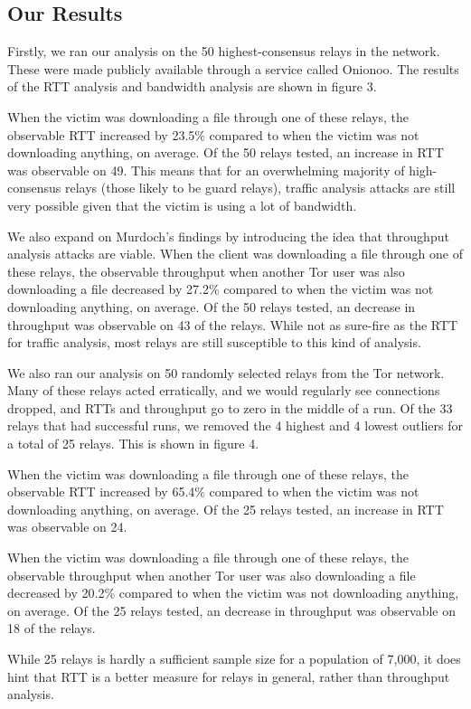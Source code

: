 \documentclass[12pt,journal]{IEEEtran}
\begin{document}
\subsection{Our Results}
Firstly, we ran our analysis on the 50 highest-consensus relays in the network. These were made publicly available through a service called Onionoo. The results of the RTT analysis and bandwidth analysis are shown in figure 3.
\par
When the victim was downloading a file through one of these relays, the observable RTT increased by 23.5\% compared to when the victim was not downloading anything, on average. Of the 50 relays tested, an increase in RTT was observable on 49. This means that for an overwhelming majority of high-consensus relays (those likely to be guard relays), traffic analysis attacks are still very possible given that the victim is using a lot of bandwidth.
\par
We also expand on Murdoch's findings by introducing the idea that throughput analysis attacks are viable. When the client was downloading a file through one of these relays, the observable throughput when another Tor user was also downloading a file decreased by 27.2\% compared to when the victim was not downloading anything, on average. Of the 50 relays tested, an decrease in throughput was observable on 43 of the relays. While not as sure-fire as the RTT for traffic analysis, most relays are still susceptible to this kind of analysis.

\par
We also ran our analysis on 50 randomly selected relays from the Tor network. Many of these relays acted erratically, and we would regularly see connections dropped, and RTTs and throughput go to zero in the middle of a run. Of the 33 relays that had successful runs, we removed the 4 highest and 4 lowest outliers for a total of 25 relays. This is shown in figure 4.
\par
When the victim was downloading a file through one of these relays, the observable RTT increased by 65.4\% compared to when the victim was not downloading anything, on average. Of the 25 relays tested, an increase in RTT was observable on 24.
\par
When the victim was downloading a file through one of these relays, the observable throughput when another Tor user was also downloading a file decreased by 20.2\% compared to when the victim was not downloading anything, on average. Of the 25 relays tested, an decrease in throughput was observable on 18 of the relays.
\par
While 25 relays is hardly a sufficient sample size for a population of 7,000, it does hint that RTT is a better measure for relays in general, rather than throughput analysis.
\end{document}
